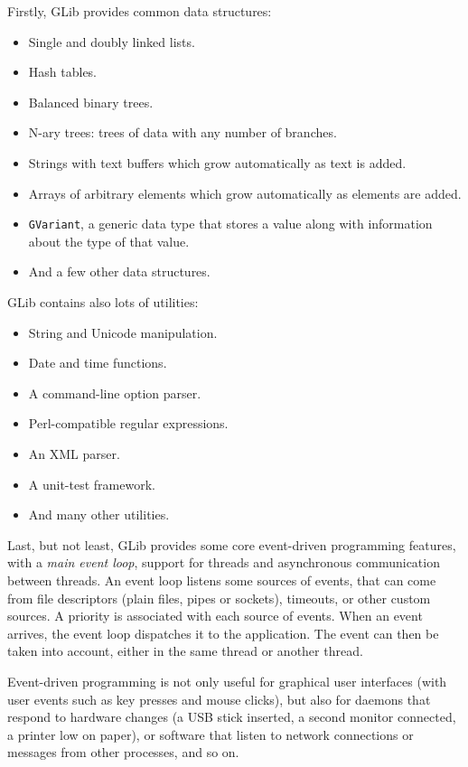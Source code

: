 \documentclass[a4paper,notumble]{leaflet}
\begin{document}
Firstly, GLib provides common data structures:
\begin{itemize}
  \item Single and doubly linked lists.
  \item Hash tables.
  \item Balanced binary trees.
  \item N-ary trees: trees of data with any number of branches.
  \item Strings with text buffers which grow automatically as text is added.
  \item Arrays of arbitrary elements which grow automatically as elements are added.
  \item \texttt{GVariant}, a generic data type that stores a value along with information about the type of that value.
  \item And a few other data structures.
\end{itemize}

\bigskip
GLib contains also lots of utilities:
\begin{itemize}
  \item String and Unicode manipulation.
  \item Date and time functions.
  \item A command-line option parser.
  \item Perl-compatible regular expressions.
  \item An XML parser.
  \item A unit-test framework.
  \item And many other utilities.
\end{itemize}

\bigskip
Last, but not least, GLib provides some core event-driven programming features, with a \textit{main event loop}, support for threads and asynchronous communication between threads. An event loop listens some sources of events, that can come from file descriptors (plain files, pipes or sockets), timeouts, or other custom sources. A priority is associated with each source of events. When an event arrives, the event loop dispatches it to the application. The event can then be taken into account, either in the same thread or another thread.

Event-driven programming is not only useful for graphical user interfaces (with user events such as key presses and mouse clicks), but also for daemons that respond to hardware changes (a USB stick inserted, a second monitor connected, a printer low on paper), or software that listen to network connections or messages from other processes, and so on.
\end{document}
